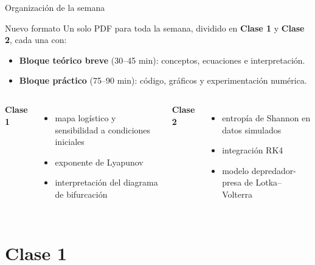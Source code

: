 




\frame{\titlepage}

\begin{frame}{Organización de la semana}
\begin{block}{Nuevo formato}
Un solo PDF para toda la semana, dividido en \textbf{Clase 1} y \textbf{Clase 2}, cada una con:
\begin{itemize}
    \item \textbf{Bloque teórico breve} (30--45 min): conceptos, ecuaciones e interpretación.
    \item \textbf{Bloque práctico} (75--90 min): código, gráficos y experimentación numérica.
\end{itemize}
\end{block}

\vspace{0.3cm}
\begin{columns}[T,onlytextwidth]
\textbf{Clase 1}
\begin{itemize}
    \item mapa logístico y sensibilidad a condiciones iniciales
    \item exponente de Lyapunov
    \item interpretación del diagrama de bifurcación
\end{itemize}
\textbf{Clase 2}
\begin{itemize}
    \item entropía de Shannon en datos simulados
    \item integración RK4
    \item modelo depredador-presa de Lotka--Volterra
\end{itemize}
\end{columns}
\end{frame}

\section{Clase 1}

